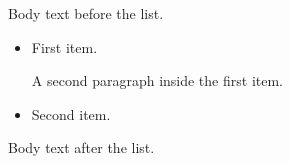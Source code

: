 \documentclass{article}
\begin{document}
Body text before the list.

\begin{itemize}
  \item First item.

    A second paragraph inside the first item.
  \item Second item.
\end{itemize}

Body text after the list.
\end{document}
